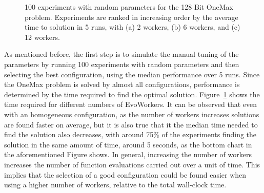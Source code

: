 \documentclass[graybox]{svmult}
\begin{document}
\begin{figure}[h!t]
    \centering

    \caption{100 experiments with random parameters for the 128 Bit OneMax problem.
    Experiments are ranked in increasing order by the average time to solution in 5 runs, with
    (a) 2 workers, (b) 6 workers, and (c) 12 workers.}
    \label{fig:effort}
  \end{figure}
As mentioned before, the first step is to simulate the manual tuning of the parameters
by running 100 experiments with random parameters and then selecting the best configuration,
using the median performance over 5 runs. Since the OneMax problem is solved by almost all
configurations, performance is determined by the time required to find the optimal solution.
Figure~\ref{fig:effort} shows the time required for different numbers of EvoWorkers.
It can be observed that even with an homogeneous configuration, as the number of workers
increases solutions are found faster on average, but it is also true
that it the median time needed to find the solution also decreases,
with around 75\% of the experiments finding the solution in the same
amount of time, around 5 seconds, as the bottom chart in the
aforementioned Figure shows.  In general, increasing the number of workers increases
the number of function evaluations carried out over a unit of time. This implies that the selection
of a good configuration could be found easier when using a higher number of workers, relative
to the total wall-clock time.
\end{document}
